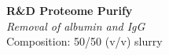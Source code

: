 \textbf{R&D Proteome Purify} 
\\
\textit{Removal of albumin and IgG}
\\
Composition: 50/50 (v/v) slurry 
